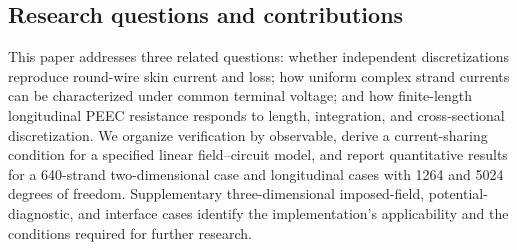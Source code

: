 \hypertarget{01.scope.heading}{}
\subsection{Research questions and contributions}

\hypertarget{01.scope.p1}{}
This paper addresses three related questions: whether independent discretizations reproduce round-wire skin current and loss; how uniform complex strand currents can be characterized under common terminal voltage; and how finite-length longitudinal PEEC resistance responds to length, integration, and cross-sectional discretization. We organize verification by observable, derive a current-sharing condition for a specified linear field–circuit model, and report quantitative results for a 640-strand two-dimensional case and longitudinal cases with 1264 and 5024 degrees of freedom. Supplementary three-dimensional imposed-field, potential-diagnostic, and interface cases identify the implementation's applicability and the conditions required for further research.
